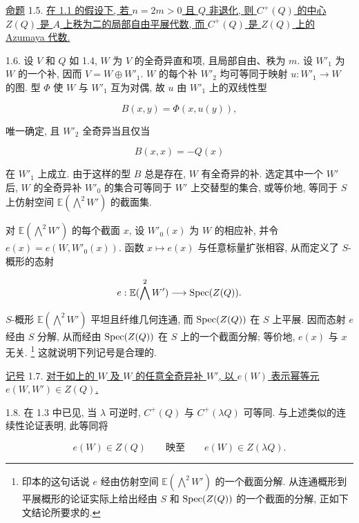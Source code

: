 \underline{命题} 1.5. \underline{在 1.1 的假设下, 若 $n=2m>0$ 且 $Q$ 非退化, 则 $C^+(Q)$ 的中心 $Z(Q)$ 是 $A$ 上秩为二的局部自由平展代数, 而 $C^+(Q)$ 是 $Z(Q)$ 上的 Azumaya 代数.}

1.6. 设 $V$ 和 $Q$ 如 1.4, $W$ 为 $V$ 的全奇异直和项, 且局部自由、秩为 $m$. 设 $W'_1$ 为 $W$ 的一个补, 因而 $V=W\oplus W'_1$. $W$ 的每个补 $W'_2$ 均可等同于映射 $u:W'_1\to W$ 的图. 型 $\Phi$ 使 $W$ 与 $W'_1$ 互为对偶, 故 $u$ 由 $W'_1$ 上的双线性型


\begin{equation*}
B(x,y)=\Phi(x,u(y)),
\end{equation*}

唯一确定, 且 $W'_2$ 全奇异当且仅当

\begin{equation*}
B(x,x)=-Q(x)
\end{equation*}

在 $W'_1$ 上成立. 由于这样的型 $B$ 总是存在, $W$ 有全奇异的补. 选定其中一个 $W'$ 后, $W$ 的全奇异补 $W'_0$ 的集合可等同于 $W'$ 上交替型的集合, 或等价地, 等同于 $S$ 上仿射空间 $\mathbb E(\bigwedge^2W')$ 的截面集.

对 $\mathbb E(\bigwedge^2W')$ 的每个截面 $x$, 设 $W'_0(x)$ 为 $W$ 的相应补, 并令 $e(x)=e(W,W'_0(x))$. 函数 $x\mapsto e(x)$ 与任意标量扩张相容, 从而定义了 $S$-概形的态射

\begin{equation*}
e:\mathbb E(\bigwedge^2W')\longrightarrow\operatorname{Spec}(Z(Q)).
\end{equation*}

$S$-概形 $\mathbb E(\bigwedge^2W')$ 平坦且纤维几何连通, 而 $\operatorname{Spec}(Z(Q))$ 在 $S$ 上平展. 因而态射 $e$ 经由 $S$ 分解, 从而经由 $\operatorname{Spec}(Z(Q))$ 在 $S$ 上的一个截面分解; 等价地, $e(x)$ 与 $x$ 无关.
\footnote{印本的这句话说 $e$ 经由仿射空间 $\mathbb E(\bigwedge^2W')$ 的一个截面分解. 从连通概形到平展概形的论证实际上给出经由 $S$ 和 $\operatorname{Spec}(Z(Q))$ 的一个截面的分解, 正如下文结论所要求的.}
这就说明下列记号是合理的.

\underline{记号} 1.7. \underline{对于如上的 $W$ 及 $W$ 的任意全奇异补 $W'$, 以 $e(W)$ 表示幂等元 $e(W,W')\in Z(Q)$.}

1.8. 在 1.3 中已见, 当 $\lambda$ 可逆时, $C^+(Q)$ 与 $C^+(\lambda Q)$ 可等同. 与上述类似的连续性论证表明, 此等同将

\begin{equation*}
e(W)\in Z(Q)\qquad\text{映至}\qquad e(W)\in Z(\lambda Q).
\end{equation*}

